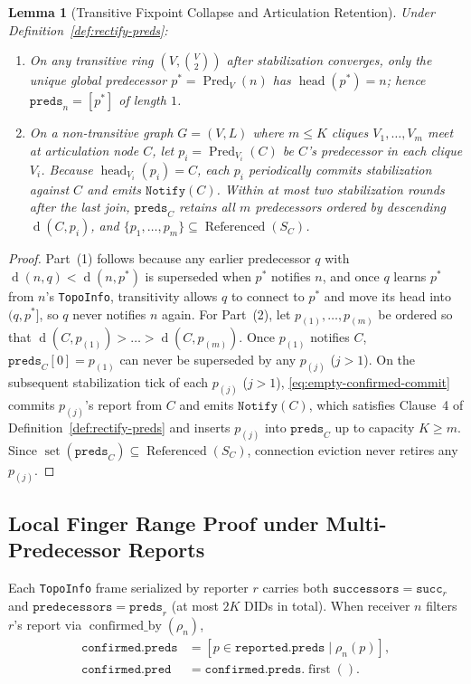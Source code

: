 \documentclass[journal]{IEEEtran}
\newtheorem{lemma}{Lemma}
\newcommand{\dist}{\operatorname{d}}
\newcommand{\Pred}{\operatorname{Pred}}
\newcommand{\Head}{\operatorname{head}}
\newcommand{\Referenced}{\operatorname{Referenced}}
\begin{document}
\begin{lemma}[Transitive Fixpoint Collapse and Articulation Retention]
\label{lem:articulation-retention}
Under Definition~\ref{def:rectify-preds}:
\begin{enumerate}
  \item On any transitive ring $(V, \binom{V}{2})$ after stabilization
  converges, only the unique global predecessor $p^* = \Pred_V(n)$ has
  $\Head(p^*) = n$; hence $\texttt{preds}_n = [p^*]$ of length $1$.
  \item On a non-transitive graph $G = (V, L)$ where $m \le K$ cliques
  $V_1, \dots, V_m$ meet at articulation node $C$, let $p_i = \Pred_{V_i}(C)$
  be $C$'s predecessor in each clique $V_i$. Because $\Head_{V_i}(p_i) = C$,
  each $p_i$ periodically commits stabilization against $C$ and emits
  $\texttt{Notify}(C)$. Within at most two stabilization rounds after the last
  join, $\texttt{preds}_C$ retains all $m$ predecessors ordered by descending
  $\dist(C, p_i)$, and $\{p_1, \dots, p_m\} \subseteq \Referenced(S_C)$.
\end{enumerate}
\end{lemma}
\begin{proof}
Part~(1) follows because any earlier predecessor $q$ with $\dist(n, q) <
\dist(n, p^*)$ is superseded when $p^*$ notifies $n$, and once $q$ learns $p^*$
from $n$'s \texttt{TopoInfo}, transitivity allows $q$ to connect to $p^*$ and
move its head into $(q, p^*]$, so $q$ never notifies $n$ again. For Part~(2),
let $p_{(1)}, \dots, p_{(m)}$ be ordered so that $\dist(C, p_{(1)}) > \dots >
\dist(C, p_{(m)})$. Once $p_{(1)}$ notifies $C$, $\texttt{preds}_C[0] = p_{(1)}$
can never be superseded by any $p_{(j)}$ ($j > 1$). On the subsequent
stabilization tick of each $p_{(j)}$ ($j > 1$), \eqref{eq:empty-confirmed-commit}
commits $p_{(j)}$'s report from $C$ and emits $\texttt{Notify}(C)$, which
satisfies Clause~4 of Definition~\ref{def:rectify-preds} and inserts $p_{(j)}$
into $\texttt{preds}_C$ up to capacity $K \ge m$. Since
$\operatorname{set}(\texttt{preds}_C) \subseteq \Referenced(S_C)$, connection
eviction never retires any $p_{(j)}$.
\end{proof}

\subsection{Local Finger Range Proof under Multi-Predecessor Reports}
Each \texttt{TopoInfo} frame serialized by reporter $r$ carries both
$\texttt{successors} = \texttt{succ}_r$ and
$\texttt{predecessors} = \texttt{preds}_r$ (at most $2K$ DIDs in total). When
receiver $n$ filters $r$'s report via $\operatorname{confirmed\_by}(\rho_n)$,
\begin{align}
  \texttt{confirmed.preds} &= [p \in \texttt{reported.preds} \mid \rho_n(p)], \\
  \texttt{confirmed.pred}  &= \texttt{confirmed.preds}.\operatorname{first}().
\end{align}
\end{document}
